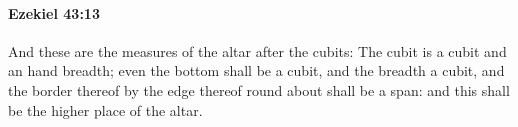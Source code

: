 
		\paragraph{Ezekiel 43:13} %
			\label{EZEKIEL-43-13}

			And these are the measures of the altar after the cubits: The cubit is a cubit and an hand breadth; even the bottom shall be a cubit, and the breadth a cubit, and the border thereof by the edge thereof round about shall be a span: and this shall be the higher place of the altar.


